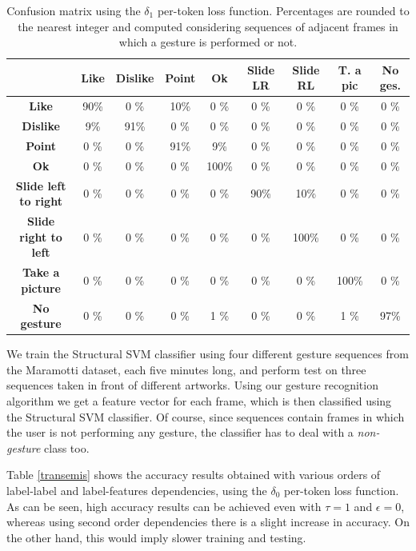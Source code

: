 \begin{table}
\begin{center}
\begin{tabular}{|c|c|c|c|c|c|c|c|c|}
\hline
 	& \textbf{Like}	& \textbf{Dislike}	&\textbf{Point}	&\textbf{Ok}	&\textbf{Slide LR}	&\textbf{Slide RL}	&\textbf{T. a pic}	& \textbf{No ges.} \\
\hline
\hline
 \textbf{Like}  & 90\% & 0 \% & 10\% & 0 \% & 0 \% & 0 \% & 0 \% & 0 \% \\
\textbf{Dislike}  & 9\% & 91\% & 0 \% & 0 \% & 0 \% & 0 \% & 0 \% & 0 \% \\
\textbf{Point}  & 0 \% & 0 \% & 91\% & 9\% & 0 \% & 0 \% & 0 \% & 0 \% \\
\textbf{Ok}  & 0 \% & 0 \% & 0 \% & 100\% & 0 \% & 0 \% & 0 \% & 0 \% \\
\textbf{Slide left to right}  & 0 \% & 0 \% & 0 \% & 0 \% & 90\% & 10\% & 0 \% & 0 \% \\
\textbf{Slide right to left} & 0 \% & 0 \% & 0 \% & 0 \% & 0 \% & 100\% & 0 \% & 0 \% \\
\textbf{Take a picture} & 0 \% & 0 \% & 0 \% & 0 \% & 0 \% & 0 \% & 100\% & 0 \% \\
\textbf{No gesture}  & 0 \% & 0 \% & 0 \% & 1 \% & 0 \% & 0 \% & 1 \% & 97\% \\
\hline
\end{tabular}
\end{center}
\caption{Confusion matrix using the $\delta_1$ per-token loss function.  Percentages are rounded to the nearest integer and computed considering sequences of adjacent frames in which a gesture is performed or not.}
\label{losses1}
\end{table}

We train the Structural SVM classifier using four different gesture sequences from the Maramotti dataset, each five minutes long, and perform test on three sequences taken in front of different artworks. Using our gesture recognition algorithm we get a feature vector for each frame, which is then classified using the Structural SVM classifier. Of course, since sequences contain frames in which the user is not performing any gesture, the classifier has to deal with a \textit{non-gesture} class too.

Table \ref{transemis} shows the accuracy results obtained with various orders of label-label and label-features dependencies, using the $\delta_0$ per-token loss function. As can be seen, high accuracy results can be achieved even with $\tau = 1$ and $\epsilon = 0$, whereas using second order dependencies there is a slight increase in accuracy. On the other hand, this would imply slower training and testing.

